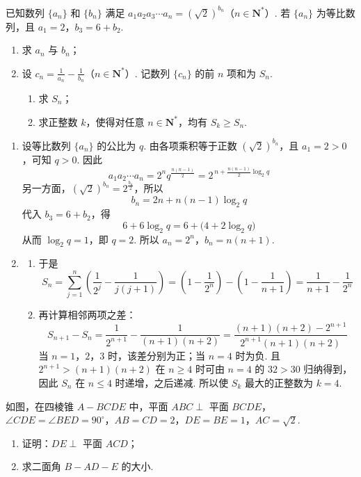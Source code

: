 \begin{problem}
已知数列 \(\{a_n\}\) 和 \(\{b_n\}\) 满足 \(a_1a_2a_3\cdots a_n = (\sqrt{2})^{b_n}\)（\(n \in \mathbf{N}^*\)）. 若 \(\{a_n\}\) 为等比数列，且 \(a_1 = 2\)，\(b_3 = 6 + b_2\).

\begin{enumerate}
\item 求 \(a_{n}\) 与 \(b_{n}\)；
\item 设 \(c_{n} = \frac{1}{a_{n}} - \frac{1}{b_{n}}\)（\(n \in \mathbf{N}^*\)）. 记数列 \(\{c_{n}\}\) 的前 \(n\) 项和为 \(S_{n}\).

\begin{enumerate}
\item 求 \(S_{n}\)；
\item 求正整数 \(k\)，使得对任意 \(n \in \mathbf{N}^*\)，均有 \(S_k \geqslant S_n\).
\end{enumerate}
\end{enumerate}
\end{problem}

\begin{solution}
\begin{enumerate}
\item
设等比数列 \(\{a_n\}\) 的公比为 \(q\). 由各项乘积等于正数 \((\sqrt2)^{b_n}\)，且 \(a_1=2>0\)，可知 \(q>0\). 因此
\[
a_1a_2\cdots a_n=2^nq^{\frac{n(n-1)}2}
=2^{\,n+\frac{n(n-1)}2\log_2q}
\]
另一方面，\((\sqrt2)^{b_n}=2^{\frac{b_n}{2}}\)，所以
\[
b_n=2n+n(n-1)\log_2q
\]
代入 \(b_3=6+b_2\)，得
\[
6+6\log_2q=6+\bigl(4+2\log_2q\bigr)
\]
从而 \(\log_2q=1\)，即 \(q=2\). 所以
\(a_n=2^n\)，\(b_n=n(n+1)\).

\item
\begin{enumerate}
\item
于是
\[
S_n=\sum_{j=1}^n\left(\frac1{2^j}-\frac1{j(j+1)}\right)
=\left(1-\frac1{2^n}\right)-\left(1-\frac1{n+1}\right)
=\frac1{n+1}-\frac1{2^n}
\]
\item
再计算相邻两项之差：
\[
S_{n+1}-S_n
=\frac1{2^{n+1}}-\frac1{(n+1)(n+2)}
=\frac{(n+1)(n+2)-2^{n+1}}{2^{n+1}(n+1)(n+2)}
\]
当 \(n=1\)，\(2\)，\(3\) 时，该差分别为正；当 \(n=4\) 时为负. 且 \(2^{n+1}>(n+1)(n+2)\) 在 \(n\geqslant4\) 时可由 \(n=4\) 的 \(32>30\) 归纳得到，因此 \(S_n\) 在 \(n\leqslant4\) 时递增，之后递减. 所以使 \(S_k\) 最大的正整数为 \(k=4\).
\end{enumerate}
\end{enumerate}
\end{solution}

\begin{problem}
如图，在四棱锥 \(A - BCDE\) 中，平面 \(ABC \perp\) 平面 \(BCDE\)，\(\angle CDE = \angle BED = 90^\circ\)，\(AB = CD = 2\)，\(DE = BE = 1\)，\(AC = \sqrt{2}\).

\begin{enumerate}
\item 证明：\(DE \perp\) 平面 \(ACD\)；
\item 求二面角 \(B - AD - E\) 的大小.
\end{enumerate}

\end{problem}

